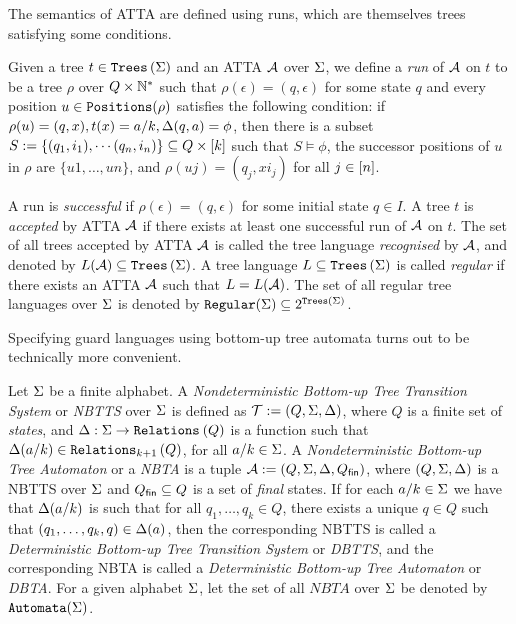 The semantics of ATTA are defined using runs, which are themselves trees satisfying some conditions.
\begin{definition}\label{def:acceptanceByAtta}
    Given a tree $t \in \trees{\alphabet}$ and an ATTA $\automaton$ over $\alphabet$, we define a \emph{run} of $\automaton$ on $t$ to be a tree $\rho$ over $\automatonStateSet \times \N^*$ such that $\rho(\epsilon) = (q, \epsilon)$ for some state $q$ and every position $u \in \positions(\rho)$ satisfies the following condition: if $\rho(u) = (q, x), t(x) = a/k, \automatonTransitionSet(q ,a) = \phi$, then there is a subset $S := \{(q_1, i_1), \dotsm (q_n, i_n)\} \subseteq Q \times \counting{k}$ such that $S \models \phi$, the successor positions of $u$ in $\rho$ are $\{u1, \dots, un\}$, and $\rho(uj) = (q_j, xi_j)$ for all $j \in \counting{n}$.
    
    A run is \emph{successful} if $\rho(\epsilon) = (q, \epsilon)$ for some initial state $q \in I$. A tree $t$ is \emph{accepted} by ATTA $\automaton$ if there exists at least one successful run of $\automaton$ on $t$. The set of all trees accepted by ATTA $\automaton$ is called the tree language \emph{recognised} by $\automaton$, and denoted by $\languageOf{\automaton} \subseteq \trees{\alphabet}$. A tree language $L \subseteq \trees{\alphabet}$ is called \emph{regular} if there exists an ATTA $\automaton$ such that $L = \languageOf{\automaton}$. The set of all regular tree languages over $\alphabet$ is denoted by $\regular{\alphabet} \subseteq 2^{\trees{\alphabet}}$.
\end{definition}

Specifying guard languages using bottom-up tree automata turns out to be technically more convenient.
\begin{definition}\label{def:nbtts}
    Let $\alphabet$ be a finite alphabet. A \emph{Nondeterministic Bottom-up Tree Transition System} or \emph{NBTTS} over $\alphabet$ is defined as $\T := (Q, \Alphabet, \Transitions)$, where $Q$ is a finite set of \emph{states}, and $\Transitions : \Alphabet \to \relations{Q}{}$ is a function such that $\Transitions(a/k) \in \relations{Q}{k+1}$, for all $a/k \in \Alphabet$. A \emph{Nondeterministic Bottom-up Tree Automaton} or a \emph{NBTA} is a tuple $\automaton := (Q, \Alphabet, \Transitions, \automatonFinalStateSet)$, where $(Q, \Alphabet, \Transitions)$ is a NBTTS over $\Alphabet$ and $\automatonFinalStateSet \subseteq Q$ is a set of \emph{final} states. If for each $a/k \in \Alphabet$ we have that $\Transitions(a/k)$ is such that for all $q_1, \dots, q_k \in Q$, there exists a unique $q \in Q$ such that $(q_1, \dots, q_k, q) \in \Transitions(a)$, then the corresponding NBTTS is called a \emph{Deterministic Bottom-up Tree Transition System} or \emph{DBTTS}, and the corresponding NBTA is called a \emph{Deterministic Bottom-up Tree Automaton} or \emph{DBTA}. For a given alphabet $\Alphabet$, let the set of all $NBTA$ over $\Alphabet$ be denoted by  $\Automata{\Alphabet}$.
\end{definition}

